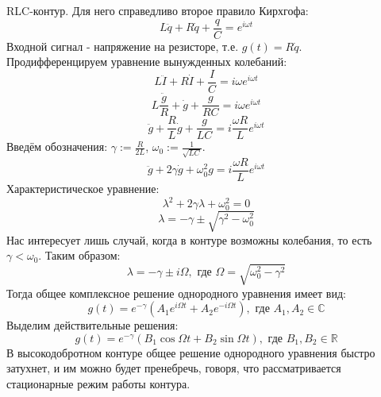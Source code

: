 \documentclass[15pt,a5paper,reqno]{article}
\begin{document}
     RLC-контур. Для него справедливо второе правило Кирхгофа:
    \begin{equation*}
        L\ddot{q} + R\dot{q} + \frac{q}{C} = e^{i\omega t}
    \end{equation*}
    Входной сигнал - напряжение на резисторе, т.е. $g(t) = R\dot{q}$. Продифференцируем уравнение вынужденных колебаний:
    \begin{equation*}
        L\ddot{I} + R\dot{I} + \frac{I}{C} = i\omega e^{i \omega t}
    \end{equation*}
    \begin{equation*}
        L\frac{\ddot{g}}{R} + \dot{g} + \frac{g}{RC} = i\omega e^{i \omega t}
    \end{equation*}
    \begin{equation*}
        \ddot{g} + \frac{R}{L}\dot{g} + \frac{g}{LC} = i\frac{\omega R}{L} e^{i \omega t}
    \end{equation*}
    Введём обозначения: $\gamma := \frac{R}{2L}$, $\omega_0 := \frac{1}{\sqrt{LC}}$.
    \begin{equation*}
        \ddot{g} + 2\gamma\dot{g} + \omega_0^2 g = i\frac{\omega R}{L} e^{i \omega t}
    \end{equation*}
    Характеристическое уравнение:
    \begin{equation*}
        \lambda^2 + 2\gamma\lambda + \omega_0^2 = 0
    \end{equation*}
    \begin{equation*}
        \lambda = -\gamma \pm \sqrt{\gamma^2 - \omega_0^2}
    \end{equation*}
    Нас интересует лишь случай, когда в контуре возможны колебания, то есть $\gamma < \omega_0$. Таким образом:
    \begin{equation*}
        \lambda = -\gamma \pm i\Omega,\text{ где }\Omega = \sqrt{\omega_0^2 - \gamma^2}
    \end{equation*}
    Тогда общее комплексное решение однородного уравнения имеет вид:
    \begin{equation*}
        g(t) = e^{-\gamma} (A_1 e^{i\Omega t} + A_2 e^{-i\Omega t}),\text{ где }A_1, A_2\in\mathbb{C} 
    \end{equation*}
    Выделим действительные решения:
    \begin{equation*}
        g(t) = e^{-\gamma} (B_1\cos{\Omega t} + B_2 \sin{\Omega t}),\text{ где }B_1, B_2\in\mathbb{R}
    \end{equation*}
    В высокодобротном контуре общее решение однородного уравнения быстро затухнет, и им можно будет пренебречь, говоря, что рассматривается стационарные режим работы контура.
\end{document}
